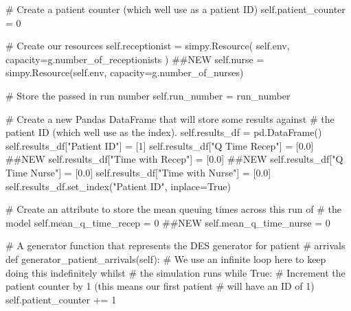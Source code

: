 \documentclass[
  letterpaper,
  DIV=11,
  numbers=noendperiod]{scrreprt}
\newenvironment{Shaded}{}{}
\newcommand{\CommentTok}[1]{\textcolor[rgb]{0.42,0.45,0.49}{#1}}
\newcommand{\ControlFlowTok}[1]{\textcolor[rgb]{0.84,0.23,0.29}{#1}}
\newcommand{\DecValTok}[1]{\textcolor[rgb]{0.00,0.36,0.77}{#1}}
\newcommand{\FloatTok}[1]{\textcolor[rgb]{0.00,0.36,0.77}{#1}}
\newcommand{\KeywordTok}[1]{\textcolor[rgb]{0.84,0.23,0.29}{#1}}
\newcommand{\NormalTok}[1]{\textcolor[rgb]{0.14,0.16,0.18}{#1}}
\newcommand{\OperatorTok}[1]{\textcolor[rgb]{0.14,0.16,0.18}{#1}}
\newcommand{\StringTok}[1]{\textcolor[rgb]{0.01,0.18,0.38}{#1}}
\newcommand{\VariableTok}[1]{\textcolor[rgb]{0.89,0.38,0.04}{#1}}
\begin{document}
\begin{tcolorbox}
\begin{Shaded}
\begin{Highlighting}[]
        \CommentTok{\# Create a patient counter (which we\textquotesingle{}ll use as a patient ID)}
        \VariableTok{self}\NormalTok{.patient\_counter }\OperatorTok{=} \DecValTok{0}

        \CommentTok{\# Create our resources}
        \VariableTok{self}\NormalTok{.receptionist }\OperatorTok{=}\NormalTok{ simpy.Resource(}
            \VariableTok{self}\NormalTok{.env, capacity}\OperatorTok{=}\NormalTok{g.number\_of\_receptionists}
\NormalTok{        ) }\CommentTok{\#\#NEW}
        \VariableTok{self}\NormalTok{.nurse }\OperatorTok{=}\NormalTok{ simpy.Resource(}\VariableTok{self}\NormalTok{.env, capacity}\OperatorTok{=}\NormalTok{g.number\_of\_nurses)}

        \CommentTok{\# Store the passed in run number}
        \VariableTok{self}\NormalTok{.run\_number }\OperatorTok{=}\NormalTok{ run\_number}

        \CommentTok{\# Create a new Pandas DataFrame that will store some results against}
        \CommentTok{\# the patient ID (which we\textquotesingle{}ll use as the index).}
        \VariableTok{self}\NormalTok{.results\_df }\OperatorTok{=}\NormalTok{ pd.DataFrame()}
        \VariableTok{self}\NormalTok{.results\_df[}\StringTok{"Patient ID"}\NormalTok{] }\OperatorTok{=}\NormalTok{ [}\DecValTok{1}\NormalTok{]}
        \VariableTok{self}\NormalTok{.results\_df[}\StringTok{"Q Time Recep"}\NormalTok{] }\OperatorTok{=}\NormalTok{ [}\FloatTok{0.0}\NormalTok{] }\CommentTok{\#\#NEW}
        \VariableTok{self}\NormalTok{.results\_df[}\StringTok{"Time with Recep"}\NormalTok{] }\OperatorTok{=}\NormalTok{ [}\FloatTok{0.0}\NormalTok{] }\CommentTok{\#\#NEW}
        \VariableTok{self}\NormalTok{.results\_df[}\StringTok{"Q Time Nurse"}\NormalTok{] }\OperatorTok{=}\NormalTok{ [}\FloatTok{0.0}\NormalTok{]}
        \VariableTok{self}\NormalTok{.results\_df[}\StringTok{"Time with Nurse"}\NormalTok{] }\OperatorTok{=}\NormalTok{ [}\FloatTok{0.0}\NormalTok{]}
        \VariableTok{self}\NormalTok{.results\_df.set\_index(}\StringTok{"Patient ID"}\NormalTok{, inplace}\OperatorTok{=}\VariableTok{True}\NormalTok{)}

        \CommentTok{\# Create an attribute to store the mean queuing times across this run of}
        \CommentTok{\# the model}
        \VariableTok{self}\NormalTok{.mean\_q\_time\_recep }\OperatorTok{=} \DecValTok{0} \CommentTok{\#\#NEW}
        \VariableTok{self}\NormalTok{.mean\_q\_time\_nurse }\OperatorTok{=} \DecValTok{0}

    \CommentTok{\# A generator function that represents the DES generator for patient}
    \CommentTok{\# arrivals}
    \KeywordTok{def}\NormalTok{ generator\_patient\_arrivals(}\VariableTok{self}\NormalTok{):}
        \CommentTok{\# We use an infinite loop here to keep doing this indefinitely whilst}
        \CommentTok{\# the simulation runs}
        \ControlFlowTok{while} \VariableTok{True}\NormalTok{:}
            \CommentTok{\# Increment the patient counter by 1 (this means our first patient}
            \CommentTok{\# will have an ID of 1)}
            \VariableTok{self}\NormalTok{.patient\_counter }\OperatorTok{+=} \DecValTok{1}


\end{Highlighting}
\end{Shaded}
\end{tcolorbox}
\end{document}
